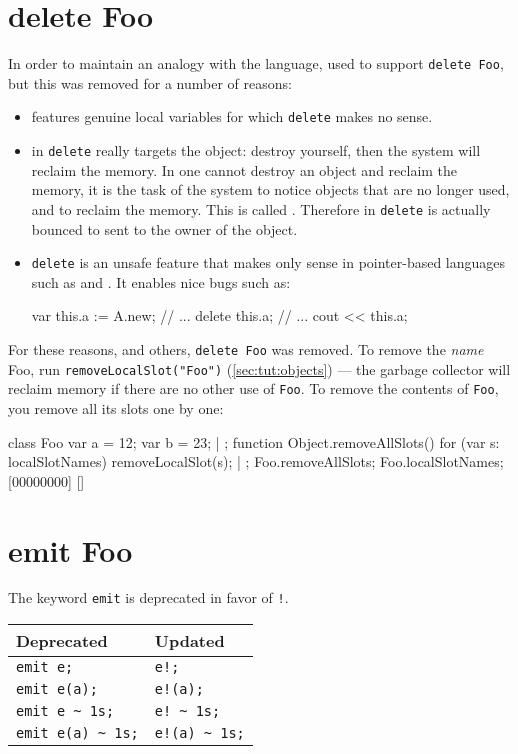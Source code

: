 \section{delete Foo}
\label{sec:k122:delete}
In order to maintain an analogy with the \Cxx language, \us used to
support \lstinline{delete Foo}, but this was removed for a number of
reasons:
\begin{itemize}
\item {} features genuine local variables for which
  \lstinline{delete} makes no sense.
\item in \Cxx \lstinline{delete} really targets the object: destroy
  yourself, then the system will reclaim the memory.  In \us one cannot
  destroy an object and reclaim the memory, it is the task of the system to
  notice objects that are no longer used, and to reclaim the memory.  This
  is called .  Therefore in \us \lstinline{delete}
  is actually bounced to  sent to the owner
  of the object.
\item \lstinline{delete} is an unsafe feature that makes only sense in
  pointer-based languages such as \C and \Cxx.  It enables nice bugs
  such as:
\begin{urbiunchecked}
var this.a := A.new;
// ...
delete this.a;
// ...
cout << this.a;
\end{urbiunchecked}
\end{itemize}

For these reasons, and others, \lstinline{delete Foo} was removed.  To
remove the \emph{name} Foo, run {\lstinline{removeLocalSlot("Foo")}}
(\autoref{sec:tut:objects}) --- the garbage collector will reclaim memory if
there are no other use of \lstinline{Foo}.  To remove the contents of
\lstinline{Foo}, you remove all its slots one by one:

\begin{urbiscript}[firstnumber=1]
class Foo
{
  var a = 12;
  var b = 23;
} | {};
function Object.removeAllSlots()
{
  for (var s: localSlotNames)
    removeLocalSlot(s);
} | {};
Foo.removeAllSlots;
Foo.localSlotNames;
[00000000] []
\end{urbiscript}

\section{emit Foo}

The keyword \lstinline{emit} is deprecated in favor of \lstinline{!}.

\begin{center}
  \begin{tabular}{|l|l|}
    \hline
    \textbf{Deprecated} & \textbf{Updated}  \\
    \hline
    \lstinline|emit e;|         & \lstinline|e!;|          \\
    \lstinline|emit e(a);|      & \lstinline|e!(a);|       \\
    \lstinline|emit e ~ 1s;|    & \lstinline|e! ~ 1s;|     \\
    \lstinline|emit e(a) ~ 1s;| & \lstinline|e!(a) ~ 1s;|  \\
    \hline
  \end{tabular}
\end{center}

